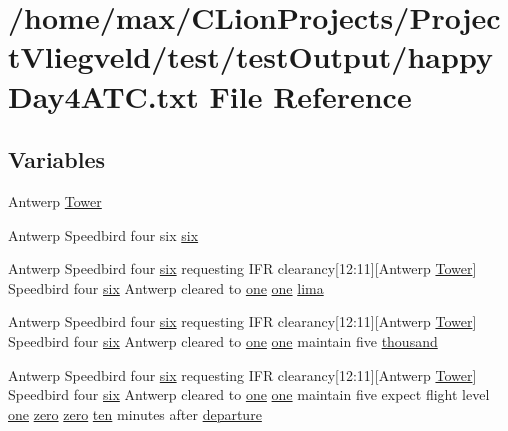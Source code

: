\hypertarget{happyDay4ATC_8txt}{}\section{/home/max/\+C\+Lion\+Projects/\+Project\+Vliegveld/test/test\+Output/happy\+Day4\+A\+TC.txt File Reference}
\label{happyDay4ATC_8txt}
\subsection*{Variables}
\begin{DoxyCompactItemize}
\item 
Antwerp \hyperlink{happyDay4ATC_8txt_a89eefcb2eadbbad8e4779c0d5874f895}{Tower}
\item 
Antwerp Speedbird four six \hyperlink{happyDay4ATC_8txt_a3279acb4484698e3b3b90d6a4e9c0c32}{six}
\item 
Antwerp Speedbird four \hyperlink{happyDay5ExpectedATC_8txt_a57978282a95204080c8ffb626c7d0bd5}{six} requesting I\+FR clearancy\mbox{[}12\+:11\mbox{]}\mbox{[}Antwerp \hyperlink{test_2testOutput_2log_8txt_ade5c2a9317c664c53d015e41bdc32393}{Tower}\mbox{]} Speedbird four \hyperlink{happyDay5ExpectedATC_8txt_a57978282a95204080c8ffb626c7d0bd5}{six} Antwerp cleared to \hyperlink{happyDay5ExpectedATC_8txt_a1bdf675837626f29e859d1a241701d26}{one} \hyperlink{happyDay5ExpectedATC_8txt_a1bdf675837626f29e859d1a241701d26}{one} \hyperlink{happyDay4ATC_8txt_abc10fad7597c191bcd8586b1cddb7835}{lima}
\item 
Antwerp Speedbird four \hyperlink{happyDay5ExpectedATC_8txt_a57978282a95204080c8ffb626c7d0bd5}{six} requesting I\+FR clearancy\mbox{[}12\+:11\mbox{]}\mbox{[}Antwerp \hyperlink{test_2testOutput_2log_8txt_ade5c2a9317c664c53d015e41bdc32393}{Tower}\mbox{]} Speedbird four \hyperlink{happyDay5ExpectedATC_8txt_a57978282a95204080c8ffb626c7d0bd5}{six} Antwerp cleared to \hyperlink{happyDay5ExpectedATC_8txt_a1bdf675837626f29e859d1a241701d26}{one} \hyperlink{happyDay5ExpectedATC_8txt_a1bdf675837626f29e859d1a241701d26}{one} maintain five \hyperlink{happyDay4ATC_8txt_a429913a0643fe14faca3dca538caa7bb}{thousand}
\item 
Antwerp Speedbird four \hyperlink{happyDay5ExpectedATC_8txt_a57978282a95204080c8ffb626c7d0bd5}{six} requesting I\+FR clearancy\mbox{[}12\+:11\mbox{]}\mbox{[}Antwerp \hyperlink{test_2testOutput_2log_8txt_ade5c2a9317c664c53d015e41bdc32393}{Tower}\mbox{]} Speedbird four \hyperlink{happyDay5ExpectedATC_8txt_a57978282a95204080c8ffb626c7d0bd5}{six} Antwerp cleared to \hyperlink{happyDay5ExpectedATC_8txt_a1bdf675837626f29e859d1a241701d26}{one} \hyperlink{happyDay5ExpectedATC_8txt_a1bdf675837626f29e859d1a241701d26}{one} maintain five expect flight level \hyperlink{happyDay5ExpectedATC_8txt_a1bdf675837626f29e859d1a241701d26}{one} \hyperlink{happyDay5ExpectedATC_8txt_a1cdb3e947394a8f9b50cff125d86fb29}{zero} \hyperlink{happyDay5ExpectedATC_8txt_a1cdb3e947394a8f9b50cff125d86fb29}{zero} \hyperlink{happyDay5ExpectedATC_8txt_ab9794f8235db42812d8ddd9368cb321e}{ten} minutes after \hyperlink{happyDay4ATC_8txt_af9835824e50bb6ca59bed75129f137e3}{departure}

\end{DoxyCompactItemize}

